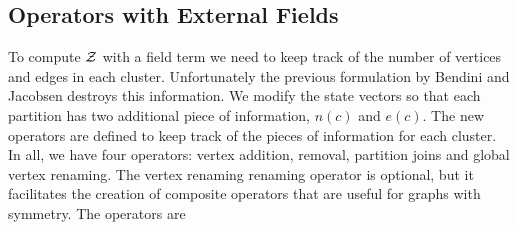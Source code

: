 \subsection{Operators with External Fields}
To compute $\mathcal{Z}$ with a field term we need to keep track of the number of vertices and edges in each cluster. Unfortunately the previous formulation by Bendini and Jacobsen destroys this information. We modify the state vectors so that each partition has two additional piece of information, $n(c)$ and $e(c)$. The new operators are defined to keep track of the pieces of information for each cluster. In all, we have four operators: vertex addition, removal, partition joins and global vertex renaming. The vertex renaming renaming operator is optional, but it facilitates the creation of composite operators that are useful for graphs with symmetry. The operators are
